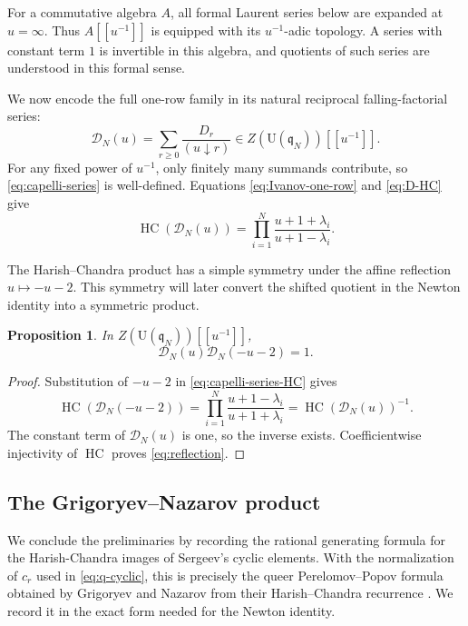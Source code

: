 \documentclass[11pt]{amsart}
\numberwithin{equation}{section}
\newtheorem{proposition}[theorem]{Proposition}
\theoremstyle{definition}
\theoremstyle{remark}
\newcommand{\q}{\mathfrak q}
\newcommand{\U}{\mathrm U}
\newcommand{\HC}{\operatorname{HC}}
\newcommand{\fall}[2]{(#1\mathbin{\downarrow}#2)}
\newcommand{\calD}{\mathcal D}
\begin{document}
For a commutative algebra \(A\), all formal Laurent series below are
expanded at \(u=\infty\).  Thus \(A[[u^{-1}]]\) is equipped with its
\(u^{-1}\)-adic topology.  A series with constant term \(1\) is
invertible in this algebra, and quotients of such series are understood
in this formal sense.

We now encode the full one-row family in its natural reciprocal
falling-factorial series:
\begin{equation}
 \calD_N(u)=\sum_{r\geq0}\frac{D_r}{\fall{u}{r}}
 \in Z(\U(\q_N))[[u^{-1}]].
 \label{eq:capelli-series}
\end{equation}
For any fixed power of \(u^{-1}\), only finitely many summands
contribute, so \eqref{eq:capelli-series} is well-defined.  Equations
\eqref{eq:Ivanov-one-row} and \eqref{eq:D-HC} give
\begin{equation}
 \HC(\calD_N(u))
 =\prod_{i=1}^N\frac{u+1+\lambda_i}{u+1-\lambda_i}.
 \label{eq:capelli-series-HC}
\end{equation}

The Harish--Chandra product has a simple symmetry under the affine
reflection \(u\mapsto -u-2\).  This symmetry will later convert the
shifted quotient in the Newton identity into a symmetric product.

\begin{proposition}
\label{prop:reflection}
In \(Z(\U(\q_N))[[u^{-1}]]\),
\begin{equation}
 \calD_N(u)\calD_N(-u-2)=1.
 \label{eq:reflection}
\end{equation}
\end{proposition}

\begin{proof}
Substitution of \(-u-2\) in \eqref{eq:capelli-series-HC} gives
\[
 \HC(\calD_N(-u-2))
 =\prod_{i=1}^N\frac{u+1-\lambda_i}{u+1+\lambda_i}
 =\HC(\calD_N(u))^{-1}.
\]
The constant term of \(\calD_N(u)\) is one, so the inverse exists.
Coefficientwise injectivity of \(\HC\) proves \eqref{eq:reflection}.
\end{proof}


\subsection{The Grigoryev--Nazarov product}
\label{sec:pp}

We conclude the preliminaries by recording the rational generating
formula for the Harish-Chandra images of Sergeev's cyclic elements.
With the normalization of \(c_r\) used in
\eqref{eq:q-cyclic}, this is precisely the queer
Perelomov--Popov formula obtained by Grigoryev and Nazarov from their
Harish--Chandra recurrence
\cite[Proposition~5 and Section~2.2]{GN2019}. We record it in the exact
form needed for the Newton identity.
\end{document}
